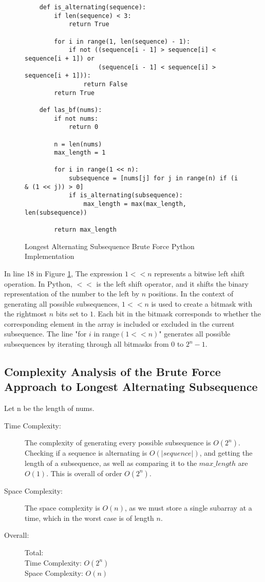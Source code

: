 \begin{figure}[H]
    \centering
    \begin{lstlisting}
    def is_alternating(sequence):
        if len(sequence) < 3:
            return True
    
        for i in range(1, len(sequence) - 1):
            if not ((sequence[i - 1] > sequence[i] < sequence[i + 1]) or
                    (sequence[i - 1] < sequence[i] > sequence[i + 1])):
                return False
        return True
    
    def las_bf(nums):
        if not nums:
            return 0
    
        n = len(nums)
        max_length = 1
    
        for i in range(1 << n):
            subsequence = [nums[j] for j in range(n) if (i & (1 << j)) > 0]
            if is_alternating(subsequence):
                max_length = max(max_length, len(subsequence))
    
        return max_length
    \end{lstlisting}
    \caption{Longest Alternating Subsequence Brute Force Python Implementation}
    \label{fig:las-bf}
\end{figure}


In line 18 in Figure \ref{fig:las-bf}, The expression $1 << n$ represents a bitwise left shift operation.
In Python, $<<$ is the left shift operator, and it shifts the binary representation of the number to the left by $n$ positions.
In the context of generating all possible subsequences, $1 << n$ is used to create a bitmask with the rightmost $n$ bits set to $1$.
Each bit in the bitmask corresponds to whether the corresponding element in the array is included or excluded in the current subsequence.
The line "for $i$ in range$(1 << n)$" generates all possible subsequences by iterating through all bitmasks from 0 to $2^n-1$.

\subsection{Complexity Analysis of the Brute Force Approach to Longest Alternating Subsequence}
Let n be the length of nums.
\begin{description}
    \item[Time Complexity:]
        The complexity of generating every possible subsequence is $O(2^n)$.
        Checking if a sequence is alternating is $O(|sequence|)$,
        and getting the length of a subsequence, as well as comparing it to the $max\_length$ are $O(1)$.
        This is overall of order $O(2^n)$.
        
    \item[Space Complexity:] 
        The space complexity is $O(n)$, as we must store a single subarray at a time,
        which in the worst case is of length $n$.
        
    \item[Overall:] Total:\\
        Time Complexity: $O(2^n)$\\
        Space Complexity: $O(n)$
    
\end{description}

